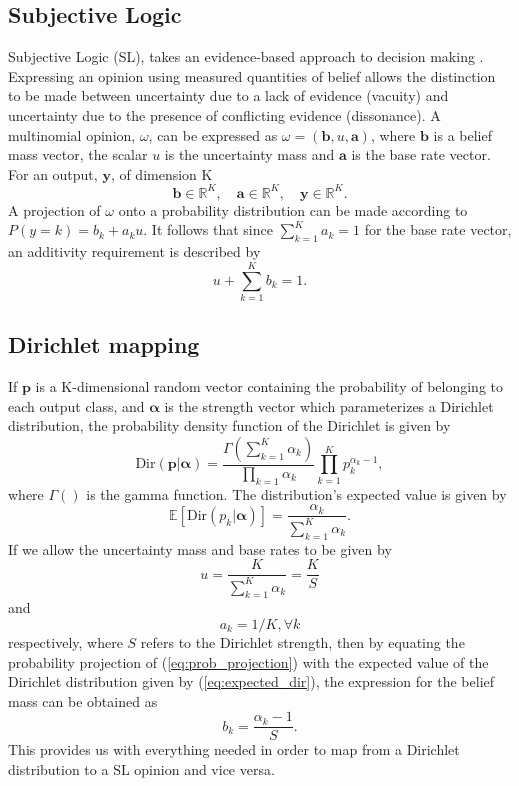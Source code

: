 \documentclass[
twocolumn,
]{ceurart}
\begin{document}
\subsection{Subjective Logic}
Subjective Logic (SL), takes an evidence-based approach to decision making \cite{Josang2016}.
Expressing an opinion using measured quantities of belief allows the distinction to be made between uncertainty due to a lack of evidence (vacuity) and uncertainty due to the presence of conflicting evidence (dissonance).
A multinomial opinion, $\omega$, can be expressed as $\omega=\left(\mathbf{b}, u, \mathbf{a}\right)$, where $\mathbf{b}$ is a belief mass vector, the scalar $u$ is the uncertainty mass and $\mathbf{a}$ is the base rate vector.
For an output, $\mathbf{y}$, of dimension K
\begin{equation}
    \mathbf{b}\in\mathbb{R}^K,\quad\mathbf{a}\in\mathbb{R}^K,\quad\mathbf{y}\in\mathbb{R}^K.
\end{equation}
A projection of $\omega$ onto a probability distribution can be made according to $P(y=k) = b_k + a_ku$.
It follows that since $\sum_{k=1}^Ka_k=1$ for the base rate vector, an additivity requirement is described by
\begin{equation}
    u+\sum_{k=1}^K b_k=1.
\end{equation}

\subsection{Dirichlet mapping}
If $\mathbf{p}$ is a K-dimensional random vector containing the probability of belonging to each output class, and $\boldsymbol{\alpha}$ is the strength vector which parameterizes a Dirichlet distribution, the probability density function of the Dirichlet is given by
\begin{equation}
    \textrm{Dir}(\mathbf{p}|\boldsymbol{\alpha})= \frac{\Gamma(\sum_{k=1}^K\alpha_k)}{\prod_{k=1}\alpha_k}\prod_{k=1}^Kp_k^{\alpha_k-1},
\end{equation}
where $\Gamma()$ is the gamma function.
The distribution's expected value is given by
\begin{equation}
\mathbb{E}\left[\textrm{Dir}(p_k\vert\boldsymbol{\alpha})\right]=\frac{\alpha_k}{\sum_{k=1}^K\alpha_k}.
\label{eq:expected_dir}
\end{equation}
If we allow the uncertainty mass and base rates to be given by
\begin{equation}
    u=\frac{K}{\sum_{k=1}^K\alpha_k}=\frac{K}{S}
\end{equation}
and
\begin{equation}
    a_k=1/K, \forall k
\end{equation}
respectively, where $S$ refers to the Dirichlet strength, then by equating the probability projection of (\ref{eq:prob_projection}) with the expected value of the Dirichlet distribution given by (\ref{eq:expected_dir}), the expression for the belief mass can be obtained as
\begin{equation}
    b_k = \frac{\alpha_k-1}{S}.
\end{equation}
This provides us with everything needed in order to map from a Dirichlet distribution to a SL opinion and vice versa.
\end{document}
